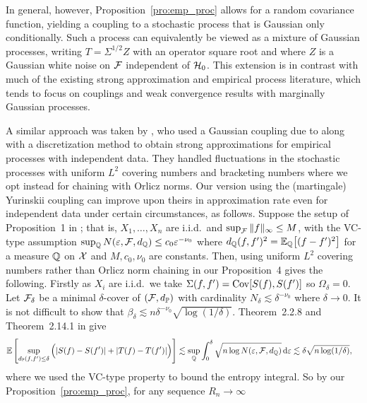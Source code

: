 In general, however, Proposition~\ref{pro:emp_proc} allows for a random
covariance function, yielding a coupling to a stochastic process that is
Gaussian only conditionally. Such a process can equivalently be viewed as a
mixture of Gaussian processes, writing $T=\Sigma^{1/2} Z$ with an operator
square root and where $Z$ is a Gaussian white noise on $\mathcal{F}$ independent of
$\mathcal{H}_0$. This extension is in contrast with much of the existing strong
approximation and empirical process literature, which tends to focus on
couplings and weak convergence results with marginally Gaussian processes.

A similar approach was taken by \citet{berthet2006revisiting}, who used a
Gaussian coupling due to \citet{zaitsev1987estimates,zaitsev1987gaussian} along
with a discretization method to obtain strong approximations for empirical
processes with independent data. They handled fluctuations in the stochastic
processes with uniform $L^2$ covering numbers and bracketing numbers where we
opt instead for chaining with Orlicz norms. Our version using the (martingale)
Yurinskii coupling can improve upon theirs in approximation rate even for
independent data under certain circumstances, as follows. Suppose the setup of
Proposition~1 in \citet{berthet2006revisiting}; that is, $X_1, \ldots, X_n$ are
i.i.d.\ and $\sup_{\mathcal{F}} \|f\|_\infty \leq M$, with the VC-type assumption
$\sup_{\mathbb{Q}} N(\varepsilon, \mathcal{F}, d_{\mathbb{Q}}) \leq c_0 \varepsilon^{-\nu_0}$ where
$d_{\mathbb{Q}}(f,f')^2 = \mathbb{E}_{\mathbb{Q}}\big[(f-f')^2\big]$ for a measure $\mathbb{Q}$ on $\mathcal{X}$ and
$M, c_0, \nu_0$ are constants. Then, using uniform $L^2$ covering numbers
rather than Orlicz norm chaining in our Proposition~4 gives the following.
Firstly as $X_i$ are i.i.d.\ we take $\Sigma(f, f') = \operatorname{Cov}[S(f), S(f')]$ so
$\Omega_\delta = 0$. Let $\mathcal{F}_\delta$ be a minimal $\delta$-cover of
$(\mathcal{F}, d_{\mathbb{P}})$ with cardinality $N_\delta \lesssim \delta^{-\nu_0}$ where
$\delta \to 0$. It is not difficult to show that
$\beta_\delta \lesssim n \delta^{-\nu_0} \sqrt{\log(1/\delta)}$.
Theorem~2.2.8 and Theorem~2.14.1 in \citet{van1996weak} give
%
\begin{align*}
  \mathbb{E}\left[
    \sup_{d_{\mathbb{P}}(f,f') \leq \delta}
    \Big(
    |S(f) - S(f')|
    + |T(f) - T(f')|
    \Big)
  \right]
  &\lesssim
  \sup_{\mathbb{Q}}
  \int_0^\delta
  \sqrt{n \log N(\varepsilon, \mathcal{F}, d_{\mathbb{Q}})}
  \,\mathrm{d}\varepsilon
  \lesssim
  \delta \sqrt{n\log(1/\delta)},
\end{align*}
%
where we used the VC-type property to bound the entropy integral.
So by our Proposition~\ref{pro:emp_proc},
for any sequence $R_n \to \infty$
